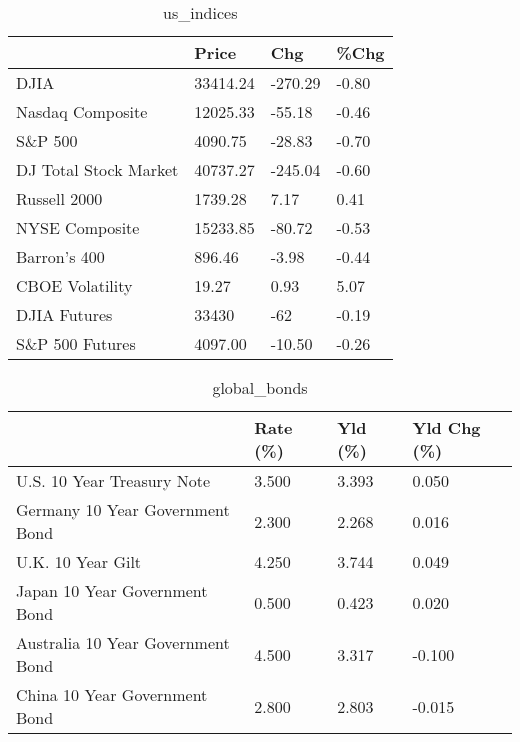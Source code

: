 \documentclass{article}%
\begin{document}
%


\begin{table}[htbp]%
\caption{us\_indices}%
\centering%
\begin{adjustbox}{width=1\textwidth}%
\begin{tabular}{llll}
\toprule
                      &    Price &     Chg &  \%Chg \\
\midrule
                 DJIA & 33414.24 & -270.29 & -0.80 \\
     Nasdaq Composite & 12025.33 &  -55.18 & -0.46 \\
              S\&P 500 &  4090.75 &  -28.83 & -0.70 \\
DJ Total Stock Market & 40737.27 & -245.04 & -0.60 \\
         Russell 2000 &  1739.28 &    7.17 &  0.41 \\
       NYSE Composite & 15233.85 &  -80.72 & -0.53 \\
         Barron's 400 &   896.46 &   -3.98 & -0.44 \\
      CBOE Volatility &    19.27 &    0.93 &  5.07 \\
         DJIA Futures &    33430 &     -62 & -0.19 \\
      S\&P 500 Futures &  4097.00 &  -10.50 & -0.26 \\
\bottomrule
\end{tabular}
%
\end{adjustbox}%
\end{table}

%


\begin{table}[htbp]%
\caption{global\_bonds}%
\centering%
\begin{adjustbox}{width=1\textwidth}%
\begin{tabular}{llll}
\toprule
                                  & Rate (\%) & Yld (\%) & Yld Chg (\%) \\
\midrule
       U.S. 10 Year Treasury Note &    3.500 &   3.393 &       0.050 \\
  Germany 10 Year Government Bond &    2.300 &   2.268 &       0.016 \\
                U.K. 10 Year Gilt &    4.250 &   3.744 &       0.049 \\
    Japan 10 Year Government Bond &    0.500 &   0.423 &       0.020 \\
Australia 10 Year Government Bond &    4.500 &   3.317 &      -0.100 \\
    China 10 Year Government Bond &    2.800 &   2.803 &      -0.015 \\
\bottomrule
\end{tabular}
%
\end{adjustbox}%
\end{table}
\end{document}
